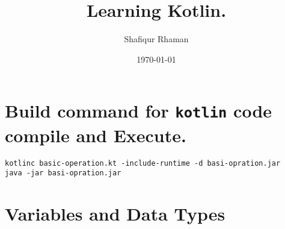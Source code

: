 \documentclass[11pt]{article}
\author{Shafiqur Rhaman}
\date{\today}
\title{Learning Kotlin.}
\begin{document}
\maketitle

\section*{Build command for \texttt{kotlin} code compile and Execute.}
\label{sec:org1f8b53d}
\begin{verbatim}
kotlinc basic-operation.kt -include-runtime -d basi-opration.jar
java -jar basi-opration.jar
\end{verbatim}
\section*{Variables and Data Types}
\label{sec:org6b4bcc3}
\end{document}
